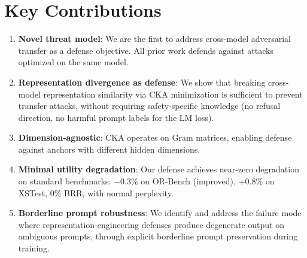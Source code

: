 \documentclass[11pt]{article}
\begin{document}
\section{Key Contributions}

\begin{enumerate}
    \item \textbf{Novel threat model}: We are the first to address cross-model adversarial transfer as a defense objective. All prior work defends against attacks optimized on the same model.

    \item \textbf{Representation divergence as defense}: We show that breaking cross-model representation similarity via CKA minimization is sufficient to prevent transfer attacks, without requiring safety-specific knowledge (no refusal direction, no harmful prompt labels for the LM loss).

    \item \textbf{Dimension-agnostic}: CKA operates on Gram matrices, enabling defense against anchors with different hidden dimensions.

    \item \textbf{Minimal utility degradation}: Our defense achieves near-zero degradation on standard benchmarks: $-0.3\%$ on OR-Bench (improved), $+0.8\%$ on XSTest, $0\%$ BRR, with normal perplexity.

    \item \textbf{Borderline prompt robustness}: We identify and address the failure mode where representation-engineering defenses produce degenerate output on ambiguous prompts, through explicit borderline prompt preservation during training.
\end{enumerate}
\end{document}

